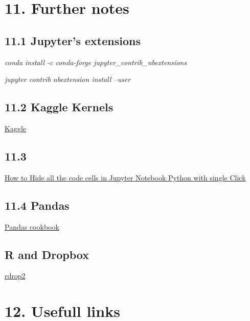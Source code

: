 \documentclass[
  12pt,
]{article}
\begin{document}
\hypertarget{further-notes}{%
\section{11. Further notes}\label{further-notes}}

\hypertarget{jupyters-extensions}{%
\subsection{11.1 Jupyter's extensions}\label{jupyters-extensions}}

\emph{conda install -c conda-forge jupyter\_contrib\_nbextensions}

\emph{jupyter contrib nbextension install --user}

\hypertarget{kaggle-kernels}{%
\subsection{11.2 Kaggle Kernels}\label{kaggle-kernels}}

\href{https://towardsdatascience.com/introduction-to-kaggle-kernels-2ad754ebf77}{Kaggle}

\hypertarget{section}{%
\subsection{11.3}\label{section}}

\href{https://www.youtube.com/watch?v=rJsWJMBksK0}{How to Hide all the
code cells in Jupyter Notebook Python with single Click}

\hypertarget{pandas}{%
\subsection{11.4 Pandas}\label{pandas}}

\href{https://mybinder.org/v2/gh/jvns/pandas-cookbook/master}{Pandas
cookbook}

\hypertarget{r-and-dropbox}{%
\subsection{R and Dropbox}\label{r-and-dropbox}}

\href{https://github.com/karthik/rdrop2}{rdrop2}

\hypertarget{usefull-links}{%
\section{12. Usefull links}\label{usefull-links}}
\end{document}

